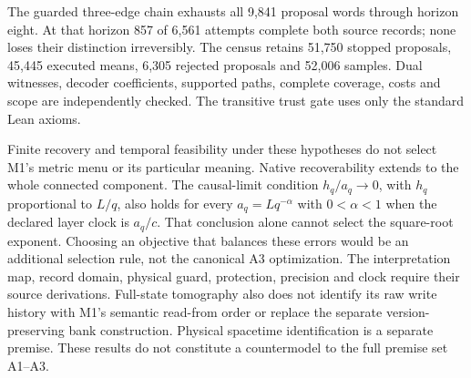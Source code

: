 The guarded three-edge chain exhausts all 9,841 proposal words through
horizon eight. At that horizon 857 of 6,561 attempts complete both source
records; none loses their distinction irreversibly. The census retains
51,750 stopped proposals, 45,445 executed means, 6,305 rejected proposals
and 52,006 samples. Dual witnesses, decoder coefficients, supported paths,
complete coverage, costs and scope are independently checked. The
transitive trust gate uses only the standard Lean axioms.

Finite recovery and temporal feasibility under these hypotheses do not
select M1's metric menu or its particular meaning. Native recoverability
extends to the whole connected component. The causal-limit condition
$h_q/a_q\to0$, with $h_q$ proportional to $L/q$, also holds for every
$a_q=Lq^{-\alpha}$ with $0<\alpha<1$ when the declared layer clock is
$a_q/c$. That conclusion alone cannot select the square-root exponent.
Choosing an objective that balances these errors would be an additional
selection rule, not the canonical A3 optimization. The interpretation map,
record domain, physical guard, protection, precision and clock require
their source derivations. Full-state tomography also does not identify its
raw write history with M1's semantic read-from order or replace the separate
version-preserving bank construction. Physical spacetime identification is
a separate premise. These results do not constitute a countermodel to the
full premise set A1--A3.
